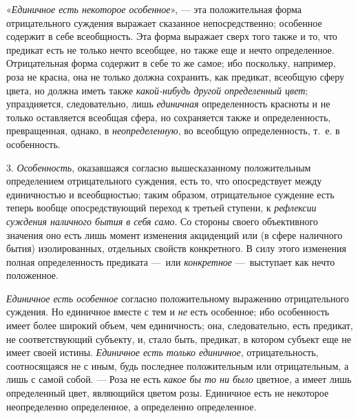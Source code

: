 \documentclass[twoside]{article}
\begin{document}
{{{«{\em Единичное есть некоторое
особенное}», — эта положительная форма отрицательного
суждения выражает сказанное непосредственно; особенное содержит в себе
всеобщность. Эта форма выражает сверх того также и то, что предикат есть не
только нечто всеобщее, но также еще и нечто определенное. Отрицательная
форма содержит в себе то же самое; ибо поскольку, например, роза не красна,
она не только должна сохранить, как предикат, всеобщую сферу цвета, но
должна иметь также {\em какой-нибудь
другой определенный цвет}; упраздняется, следовательно, лишь
{\em единичная}
определенность красноты и не только оставляется всеобщая
сфера, но сохраняется также и определенность, превращенная, однако, в
{\em неопределенную}, во
всеобщую определенность, т.~е. в особенность.

3. {\em Особенность},
оказавшаяся согласно вышесказанному положительным
определением отрицательного суждения, есть то, что опосредствует между
единичностью и всеобщностью; таким образом, отрицательное суждение есть
теперь вообще опосредствующий переход к третьей ступени, к
{\em рефлексии суждения наличного бытия
в себя само}. Со стороны своего объективного значения оно
есть лишь момент изменения акциденций или (в сфере наличного бытия)
изолированных, отдельных свойств конкретного. В силу этого изменения полная
определенность предиката —~или
{\em конкретное}
—~выступает как нечто положенное.

{\em Единичное есть особенное}
согласно положительному выражению отрицательного суждения. Но
единичное вместе с тем и {\em не}
есть особенное; ибо особенность имеет более широкий объем,
чем единичность; она, следовательно, есть предикат, не соответствующий
субъекту, и, стало быть, предикат, в котором субъект еще не имеет своей
истины. {\em Единичное есть только
единичное}, отрицательность, соотносящаяся не с иным, будь
последнее положительным или отрицательным, а лишь с самой собой. —
Роза не есть {\em какое бы
то ни было} цветное, а имеет лишь определенный цвет,
являющийся цветом розы. Единичное есть не некоторое неопределенно
определенное, а определенно определенное.

}}}
\end{document}
